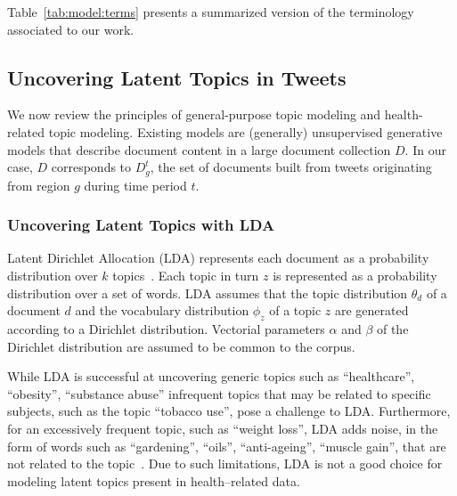 Table~\ref{tab:model:terms} presents a summarized
version of the terminology associated to our work.

\subsection{Uncovering Latent Topics in Tweets}
We now review the principles of general-purpose topic modeling and
health-related topic modeling. Existing models are (generally)
unsupervised generative models that describe document content in a
large document collection $D$. In our case, $D$ corresponds to
$D_g^t$, the set of documents built from tweets originating from 
region $g$ during time period $t$. 

\subsubsection{Uncovering Latent Topics with LDA}
Latent Dirichlet Allocation (LDA) represents each document as
a probability distribution over $k$ topics~\cite{lda}. Each topic 
in turn $z$ is represented as a probability distribution over a set of
words. LDA assumes that the topic distribution $\theta_d$ of a 
document $d$ and the vocabulary distribution $\phi_z$ of a 
topic $z$ are generated according to a Dirichlet distribution. 
Vectorial parameters $\alpha$ and $\beta$ of the Dirichlet distribution
are assumed to be common to the corpus.

While LDA is successful at uncovering generic topics such as
``healthcare'', ``obesity'', ``substance abuse'' infrequent topics 
that may be related to specific subjects, such as the
topic ``tobacco use'', pose a challenge to LDA. Furthermore, for an
excessively frequent topic, such as ``weight loss'', LDA adds noise,
in the form of words such as ``gardening'', ``oils'', ``anti-ageing'', 
``muscle gain'', that are not related to the topic~\cite{atam2,prier2011identifying}.
Due to such limitations, LDA is not a good choice for modeling latent topics
present in health--related data.

